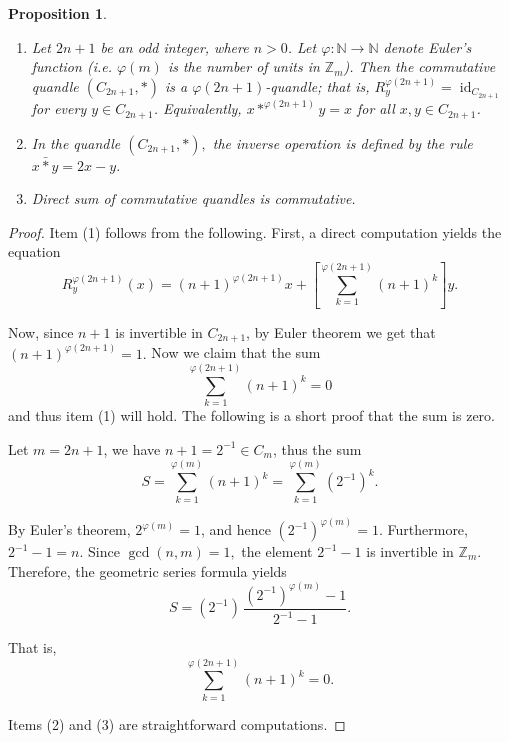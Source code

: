 \documentclass[12pt]{amsart}
\newtheorem{pro}[thm]{Proposition}
\theoremstyle{definition}
\theoremstyle{remark}
\begin{document}
\begin{pro}
\begin{enumerate}

\item


Let \(2n+1\) be an odd integer, where \(n>0\). Let
\(\varphi \colon \mathbb{N} \to \mathbb{N}\) denote Euler's 
function (i.e. $\varphi(m)$ is the number of units in $\mathbb{Z}_m$). Then the commutative quandle \((C_{2n+1}, *)\) is a
\(\varphi(2n+1)\)-quandle; that is,
$
R_y^{\varphi(2n+1)}=\operatorname{id}_{C_{2n+1}}
$
for every \(y\in C_{2n+1}\). Equivalently,
$
x *^{\varphi(2n+1)} y = x
$
for all \(x,y\in C_{2n+1}\).
 
 
\item
 In the quandle $(C_{2n+1}, *),$ the inverse operation is defined by the rule $x \bar{*} y = 2 x - y$. 
 
\item
 Direct sum of commutative quandles is commutative.
\end{enumerate}

\end{pro}



\begin{proof}


Item (1) follows from the following.
First, a direct computation yields the equation
\[
R^{\varphi(2n+1)}_y(x) = (n+1)^{\varphi(2n+1)} x + [\sum_{k=1}^{\varphi(2n+1)}(n+1)^k]y.
\]

Now, since $n+1$ is invertible in $C_{2n+1}$, by Euler theorem we get that $(n+1)^{\varphi(2n+1)}=1.$   Now we claim that the sum $$ \sum_{k=1}^{\varphi(2n+1)}(n+1)^k=0$$ and thus item (1) will hold.  The following is a short proof that the sum is zero.

Let $
m=2n+1$, we have $n+1= 2^{-1} \in C_m$, thus the sum
\[
S=\sum_{k=1}^{\varphi(m)}(n+1)^k=\sum_{k=1}^{\varphi(m)}(2^{-1})^k.
\]


By Euler's theorem, $
2^{\varphi(m)}=1$,
and hence
$
(2^{-1})^{\varphi(m)} = 1.$ Furthermore, $
2^{-1}-1=n.$
Since $\gcd(n,m)=1,$
the element $2^{-1}-1$ is invertible in $\mathbb{Z}_m$. Therefore, the geometric series formula yields
\[
S
=(2^{-1})\,
\frac{(2^{-1})^{\varphi(m)}-1}{2^{-1}-1}.
\]


That is,
\[
\sum_{k=1}^{\varphi(2n+1)}(n+1)^k = 0.
\]


 Items (2) and (3) are straightforward computations.
\end{proof}
\end{document}
